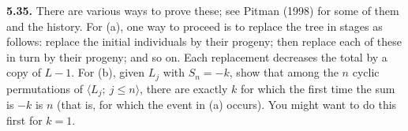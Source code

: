 \textbf{5.35.} There are various ways to prove these; see Pitman (1998) for some of them and the history. For (a), one way to proceed is to replace the tree in stages as follows: replace the initial individuals by their progeny; then replace each of these in turn by their progeny; and so on. Each replacement decreases the total by a copy of $L-1$. For (b), given $L_j$ with $S_n=-k$, show that among the $n$ cyclic permutations of $\langle L_j;\ j\le n\rangle$, there are exactly $k$ for which the first time the sum is $-k$ is $n$ (that is, for which the event in (a) occurs). You might want to do this first for $k=1$.
